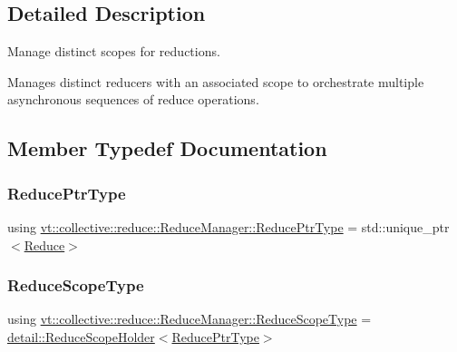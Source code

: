 \subsection{Detailed Description}
Manage distinct scopes for reductions. 

Manages distinct reducers with an associated scope to orchestrate multiple asynchronous sequences of reduce operations. 

\subsection{Member Typedef Documentation}
\mbox{\label{structvt_1_1collective_1_1reduce_1_1_reduce_manager_ae6d6635476f9d9f601d131a334ca3817}} 
\subsubsection{\texorpdfstring{Reduce\+Ptr\+Type}{ReducePtrType}}
{\footnotesize\ttfamily using \hyperlink{structvt_1_1collective_1_1reduce_1_1_reduce_manager_ae6d6635476f9d9f601d131a334ca3817}{vt\+::collective\+::reduce\+::\+Reduce\+Manager\+::\+Reduce\+Ptr\+Type} =  std\+::unique\+\_\+ptr$<$\hyperlink{structvt_1_1collective_1_1reduce_1_1_reduce}{Reduce}$>$}

\mbox{\label{structvt_1_1collective_1_1reduce_1_1_reduce_manager_a2c340e5d3b12e4f2df64b9c1502445cf}} 
\subsubsection{\texorpdfstring{Reduce\+Scope\+Type}{ReduceScopeType}}
{\footnotesize\ttfamily using \hyperlink{structvt_1_1collective_1_1reduce_1_1_reduce_manager_a2c340e5d3b12e4f2df64b9c1502445cf}{vt\+::collective\+::reduce\+::\+Reduce\+Manager\+::\+Reduce\+Scope\+Type} =  \hyperlink{structvt_1_1collective_1_1reduce_1_1detail_1_1_reduce_scope_holder}{detail\+::\+Reduce\+Scope\+Holder}$<$\hyperlink{structvt_1_1collective_1_1reduce_1_1_reduce_manager_ae6d6635476f9d9f601d131a334ca3817}{Reduce\+Ptr\+Type}$>$}



